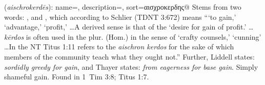 \item[Shameful gain,]

(\textit{aischrokerdēs}):
{
    name=,
    description={},
    sort=αισχροκερδης@
}
Stems from two words:  , and , which according to Schlier (TDNT 3:672) means ```to gain,' `advantage,' `profit,' \ldots A derived sense is that of the `desire for gain of profit.' \ldots \emph{kērdos} is often used in the plur. (Hom.) in the sense of `crafty counsels,' `cunning' \ldots In the NT Titus 1:11 refers to the \emph{aischron kerdos} for the sake of which members of the community teach what they ought not.'' 
Further, Liddell states: \emph{sordidly greedy for gain}, and Thayer states: \emph{from eagerness for base gain}. Simply shameful gain.
Found in 1~Tim 3:8; Titus 1:7.
